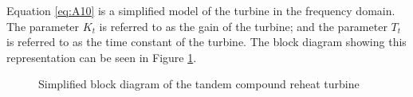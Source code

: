 Equation \ref{eq:A10} is a simplified model of the turbine in the frequency domain. The parameter $K_t$ is referred to as the gain of the turbine; and the parameter $T_t$ is referred to as the time constant of the turbine. The block diagram showing this representation can be seen in Figure \ref{fig:A05_turbine_model}. 

\begin{figure}[h]
	\centering
	
	\caption[Simplified turbine model]{Simplified block diagram of the tandem compound reheat turbine}
	\label{fig:A05_turbine_model}
\end{figure}